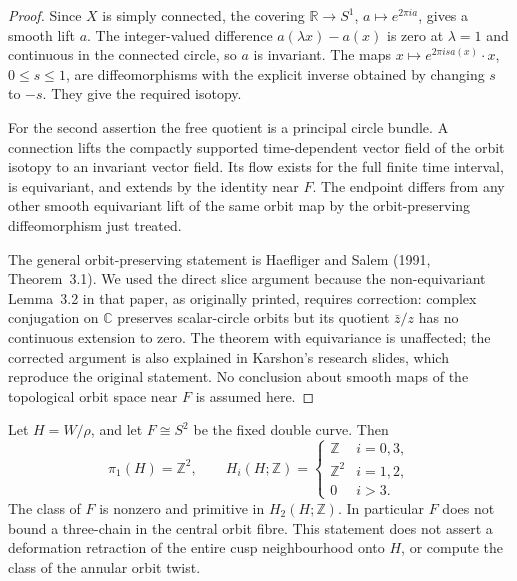 \begin{proof}
Since \(X\) is simply connected, the covering
\(\mathbb R\to S^1\), \(a\mapsto e^{2\pi ia}\), gives a smooth
lift \(a\). The integer-valued difference
\(a(\lambda x)-a(x)\) is zero at \(\lambda=1\) and continuous
in the connected circle, so \(a\) is invariant. The maps
\(x\mapsto e^{2\pi isa(x)}\cdot x\), \(0\leq s\leq1\),
are diffeomorphisms with the explicit inverse obtained by changing
\(s\) to \(-s\). They give the required isotopy.

For the second assertion the free quotient is a principal circle
bundle. A connection lifts the compactly supported time-dependent
vector field of the orbit isotopy to an invariant vector field.
Its flow exists for the full finite time interval, is equivariant,
and extends by the identity near \(F\). The endpoint differs from
any other smooth equivariant lift of the same orbit map by the
orbit-preserving diffeomorphism just treated.

The general orbit-preserving statement is Haefliger and Salem
(1991, Theorem~3.1). We used the direct slice argument because the
non-equivariant Lemma~3.2 in that paper, as originally printed,
requires correction: complex conjugation on \(\mathbb C\)
preserves scalar-circle orbits but its quotient
\(\bar z/z\) has no continuous extension to zero. The theorem
with equivariance is unaffected; the corrected argument is also
explained in Karshon's research slides, which reproduce the original
statement. No conclusion about smooth maps of the topological orbit
space near \(F\) is assumed here.
\nocite{HaefligerSalem1991D,KarshonOrbitSlidesD}
\end{proof}
\begin{proposition}
Let \(H=W/\rho\), and let \(F\cong S^2\) be the fixed double
curve. Then
\[
 \pi_1(H)=\mathbb Z^2,\qquad
 H_i(H;\mathbb Z)=
 \begin{cases}
 \mathbb Z&i=0,3,\\
 \mathbb Z^2&i=1,2,\\
 0&i>3.
 \end{cases}
\]
The class of \(F\) is nonzero and primitive in \(H_2(H;\mathbb Z)\).
In particular \(F\) does not bound a three-chain in the central
orbit fibre. This statement does not assert a deformation retraction
of the entire cusp neighbourhood onto \(H\), or compute the class
of the annular orbit twist.
\end{proposition}
